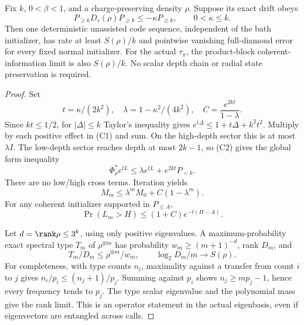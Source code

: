 \begin{theorem}
\label{thm:operatorcode}
Fix $k$, $0<\beta<1$, and a charge-preserving density $\rho$.
Suppose its exact drift obeys
\[
 P_{\ge k}D_s(\rho)P_{\ge k}\le-\kappa P_{\ge k},
 \qquad0<\kappa\le k.
 \tag{C3}
\]
Then one deterministic unassisted code sequence, independent of the bath
initializer, has rate at least $S(\rho)/k$ and pointwise vanishing
full-diamond error for every fixed normal initializer.
For the actual $\tau_\pi$, the product-block coherent-information limit
is also $S(\rho)/k$. No scalar depth chain or radial state preservation
is required.
\end{theorem}
\begin{proof}
Set
\[
 t=\kappa/(2k^2),\quad
 \lambda=1-\kappa^2/(4k^2),\quad
 C=\frac{e^{2kt}}{1-\lambda}.
 \tag{C4}
\]
Since $kt\le1/2$, for $|\Delta|\le k$ Taylor's inequality gives
$e^{t\Delta}\le1+t\Delta+k^2t^2$.
Multiply by each positive effect in (C1) and sum. On the high-depth sector
this is at most $\lambda I$. The low-depth sector reaches depth at most
$2k-1$, so (C2) gives the global form inequality
\[
 \Phi_\rho^*e^{tL}
 \le\lambda e^{tL}+e^{2kt}P_{<k}.
 \tag{C5}
\]
There are no low/high cross terms. Iteration yields
\[
 M_m\le\lambda^m M_0+C(1-\lambda^m).
 \tag{C6}
\]
For any coherent initializer supported in $P_{\le A}$,
\[
 \Pr(L_m>H)\le(1+C)e^{-t(H-A)}.
 \tag{C7}
\]

Let $d=\rank\rho\le3^k$, using only positive eigenvalues. A
maximum-probability exact spectral type $T_m$ of $\rho^{\otimes m}$
has probability $w_m\ge(m+1)^{-d}$, rank $D_m$, and
\[
 T_m/D_m\le\rho^{\otimes m}/w_m,\qquad
 \log_2D_m/m\longrightarrow S(\rho).
 \tag{C8}
\]
For completeness, with type counts $n_i$, maximality against a transfer
from count $i$ to $j$ gives
$n_i/p_i\le(n_j+1)/p_j$. Summing against $p_i$ shows
$n_j\ge mp_j-1$, hence every frequency tends to $p_j$.
The type scalar eigenvalue and the polynomial mass give the rank limit.
This is an operator statement in the actual eigenbasis, even if eigenvectors
are entangled across calls.


\end{proof}
